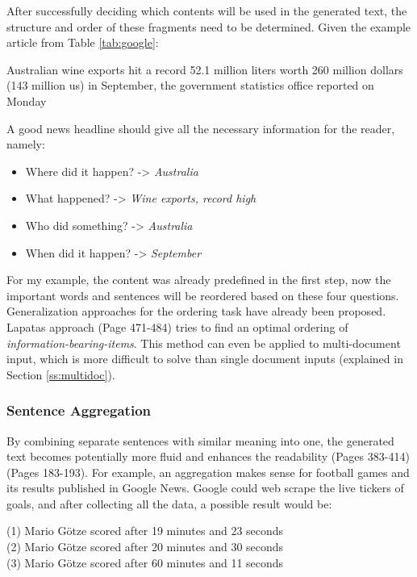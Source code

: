 After successfully deciding which contents will be used in the generated text, the structure and order of these fragments need to be determined. Given the example article from Table \ref{tab:google}:

\begin{tcolorbox}
	\begin{center}
		Australian wine exports hit a record 52.1 million liters worth 260 million dollars (143 million us) in September, the government statistics office reported on Monday 
	\end{center}
\end{tcolorbox}

A good news headline should give all the necessary information for the reader, namely:

\begin{itemize}
	\item Where did it happen? -> \textit{Australia}
	\item What happened? -> \textit{Wine exports, record high}
	\item Who did something? -> \textit{Australia}
	\item When did it happen? -> \textit{September}
\end{itemize}

For my example, the content was already predefined in the first step, now the important words and sentences will be reordered based on these four questions. Generalization approaches for the ordering task have already been proposed. Lapatas approach \cite{lapata} (Page 471-484) tries to find an optimal ordering of \textit{information-bearing-items}. This method can even be applied to multi-document input, which is more difficult to solve than single document inputs (explained in Section \ref{ss:multidoc}).

\subsubsection{Sentence Aggregation}

By combining separate sentences with similar meaning into one, the generated text becomes potentially more fluid and enhances the readability \cite{dal} (Pages 383-414) \cite{cheng-mellish2000} (Pages 183-193). For example, an aggregation makes sense for football games and its results published in Google News. Google could web scrape the live tickers of goals, and after collecting all the data, a possible result would be:

\begin{tcolorbox}
	\begin{center}
		(1) Mario Götze scored after 19 minutes and 23 seconds \\
		(2) Mario Götze scored after 20 minutes and 30 seconds \\
		(3) Mario Götze scored after 60 minutes and 11 seconds
	\end{center}
\end{tcolorbox}


